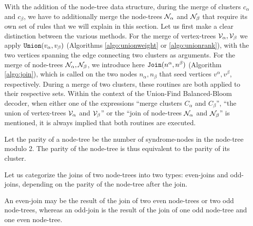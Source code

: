 With the addition of the node-tree data structure, during the merge of clusters $c_\alpha$ and $c_\beta$, we have to additionally merge the node-trees $\mathcal{N}_{\alpha}$ and $\mathcal{N}_\beta$ that require its own set of rules that we will explain in this section. Let us first make a clear distinction between the various methods. For the merge of vertex-trees $\mathcal{V}_\alpha, \mathcal{V}_\beta$ we apply $\texttt{Union}(v_\alpha, v_\beta)$ (Algorithms \ref{algo:unionweight} or \ref{algo:unionrank}), with the two vertices spanning the edge connecting two clusters as arguments. For the merge of node-trees $\mathcal{N}_\alpha, \mathcal{N}_\beta$, we introduce here $\texttt{Join}(n^\alpha, n^\beta)$ (Algorithm \ref{algo:join}), which is called on the two nodes $n_\alpha, n_\beta$ that seed vertices $v^\alpha, v^\beta$, respectively. During a merge of two clusters, these routines are both applied to their respective sets. Within the context of the Union-Find Balanced-Bloom decoder, when either one of the expressions ``merge clusters $C_\alpha$ and $C_\beta$'', ``the union of vertex-trees $\mathcal{V}_\alpha$ and $\mathcal{V}_\beta$'' or the ``join of node-trees $\mathcal{N}_{\alpha}$ and $\mathcal{N}_\beta$'' is mentioned, it is always implied that both routines are executed.

\begin{definition}\label{def:nodesetparity}
  Let the parity of a node-tree be the number of syndrome-nodes in the node-tree modulo 2. The parity of the node-tree is thus equivalent to the parity of its cluster. 
\end{definition}
Let us categorize the joins of two node-trees into two types: even-joins and odd-joins, depending on the parity of the node-tree after the join. 
\begin{definition}\label{def:oddevenjoin}
  An even-join may be the result of the join of two even node-trees or two odd node-trees, whereas an odd-join is the result of the join of one odd node-tree and one even node-tree.
\end{definition}


